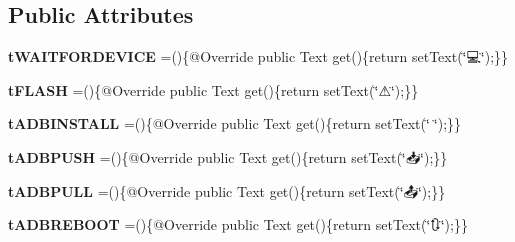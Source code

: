 \subsection*{Public Attributes}
\begin{DoxyCompactItemize}
\item 
\hypertarget{enumcom_1_1casual__dev_1_1zodui_1_1contentpanel_1_1_mode_content_1_1emote_af53eb377fd02f8ddd480199475903675}{{\bfseries t\-W\-A\-I\-T\-F\-O\-R\-D\-E\-V\-I\-C\-E} =()\{@Override public Text get()\{return set\-Text(\char`\"{}💻\char`\"{});\}\}}\label{enumcom_1_1casual__dev_1_1zodui_1_1contentpanel_1_1_mode_content_1_1emote_af53eb377fd02f8ddd480199475903675}

\item 
\hypertarget{enumcom_1_1casual__dev_1_1zodui_1_1contentpanel_1_1_mode_content_1_1emote_a07a6d39b4e18ed6385e2cd86ff6882a8}{{\bfseries t\-F\-L\-A\-S\-H} =()\{@Override public Text get()\{return set\-Text(\char`\"{}⚠\char`\"{});\}\}}\label{enumcom_1_1casual__dev_1_1zodui_1_1contentpanel_1_1_mode_content_1_1emote_a07a6d39b4e18ed6385e2cd86ff6882a8}

\item 
\hypertarget{enumcom_1_1casual__dev_1_1zodui_1_1contentpanel_1_1_mode_content_1_1emote_a4ff8c1b41cbfce42747f892d00bf15c3}{{\bfseries t\-A\-D\-B\-I\-N\-S\-T\-A\-L\-L} =()\{@Override public Text get()\{return set\-Text(\char`\"{}📲\char`\"{});\}\}}\label{enumcom_1_1casual__dev_1_1zodui_1_1contentpanel_1_1_mode_content_1_1emote_a4ff8c1b41cbfce42747f892d00bf15c3}

\item 
\hypertarget{enumcom_1_1casual__dev_1_1zodui_1_1contentpanel_1_1_mode_content_1_1emote_ac76539a9382e8135e2a72110c3f76fec}{{\bfseries t\-A\-D\-B\-P\-U\-S\-H} =()\{@Override public Text get()\{return set\-Text(\char`\"{}📥\char`\"{});\}\}}\label{enumcom_1_1casual__dev_1_1zodui_1_1contentpanel_1_1_mode_content_1_1emote_ac76539a9382e8135e2a72110c3f76fec}

\item 
\hypertarget{enumcom_1_1casual__dev_1_1zodui_1_1contentpanel_1_1_mode_content_1_1emote_a255e27c9c6d9ed1ef24106a04c709b8f}{{\bfseries t\-A\-D\-B\-P\-U\-L\-L} =()\{@Override public Text get()\{return set\-Text(\char`\"{}📤\char`\"{});\}\}}\label{enumcom_1_1casual__dev_1_1zodui_1_1contentpanel_1_1_mode_content_1_1emote_a255e27c9c6d9ed1ef24106a04c709b8f}

\item 
\hypertarget{enumcom_1_1casual__dev_1_1zodui_1_1contentpanel_1_1_mode_content_1_1emote_a4d24cec26ba7dad9b67b84c15c4f7ffa}{{\bfseries t\-A\-D\-B\-R\-E\-B\-O\-O\-T} =()\{@Override public Text get()\{return set\-Text(\char`\"{}🔃\char`\"{});\}\}}\label{enumcom_1_1casual__dev_1_1zodui_1_1contentpanel_1_1_mode_content_1_1emote_a4d24cec26ba7dad9b67b84c15c4f7ffa}


\end{DoxyCompactItemize}
